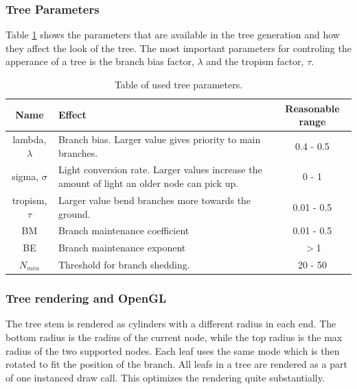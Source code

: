 \documentclass{article}
\begin{document}
	  		
	  		\subsubsection*{Tree Parameters}
	  		
	  		Table \ref{table:param} shows the parameters that are available in the tree generation and how they affect the look of the tree. The most important parameters for controling the apperance of a tree is the branch bias factor, $\lambda$ and the tropism factor, $\tau$.
	  		
	  		\begin{table} [!h]
	  			\begin{center}
	  				\caption{Table of used tree parameters.}
	  				\begin{tabular}{ | c | m{6.5cm} | c | } 
	  					\hline
	  					\textbf{Name} & \textbf{Effect} & \textbf{Reasonable range} \\
	  					\hline
	  					lambda, $\lambda$ & Branch bias. Larger value gives priority to main branches. & 0.4 - 0.5 \\ 
	  					\hline
	  					sigma, $\sigma$ & Light conversion rate. Larger values increase the amount of light an older node can pick up. & 0 - 1\\ 
	  					\hline
	  					tropism, $\tau$ & Larger value bend branches more towards the ground. & 0.01 - 0.5 \\ 
	  					\hline
	  					BM & Branch maintenance coefficient & 0.01 - 0.5 \\ 
	  					\hline
	  					BE & Branch maintenance exponent &  $>$1\\ 
	  					\hline
	  					$N_{min}$ & Threshold for branch shedding. & 20 - 50 \\ 
	  					\hline
	  				\end{tabular}
	  				
	  				\label{table:param}
	  			\end{center}
	  		\end{table}
  		
  		
  			\subsubsection*{Tree rendering and OpenGL}
  			
  				The tree stem is rendered as cylinders with a different radius in each end. The bottom radius is the radius of the current node, while the top radius is the max radius of the two supported nodes. Each leaf uses the same mode which is then rotated to fit the position of the branch. All leafs in a tree are rendered as a part of one instanced draw call. This optimizes the rendering quite substantially. 
  			
\end{document}
